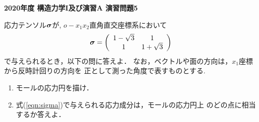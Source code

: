 \documentclass[10pt,a4j]{jarticle}
\newlength{\minitwocolumn}
\begin{document}
\newcommand{\fat}[1]{\mbox{\boldmath $#1$}}
\newcommand{\D}{\partial}
\newcommand{\w}{\omega}
\newcommand{\ga}{\alpha}
\newcommand{\gb}{\beta}
\newcommand{\gx}{\xi}
\newcommand{\gz}{\zeta}
\newcommand{\vhat}[1]{\hat{\fat{#1}}}
\newcommand{\spc}{\vspace{0.7\baselineskip}}
\newcommand{\halfspc}{\vspace{0.3\baselineskip}}

\pagestyle{empty}
\newcommand{\twofig}[2]
 {
   \begin{figure}[here]
     \begin{minipage}[t]{\minitwocolumn}
         \begin{center}   #1
         \end{center}
     \end{minipage}
         \hspace{\columnsep}
     \begin{minipage}[t]{\minitwocolumn}
         \begin{center} #2
         \end{center}
     \end{minipage}
   \end{figure}
 }
\begin{center}
{\Large \bf 2020年度 構造力学I及び演習A 演習問題5}
\end{center}
\vspace{15mm}
応力テンソル$\fat{\sigma}$が, $o-x_1x_2$直角直交座標系において
\begin{equation}
	\fat{\sigma}
	=
	\left( 
		\begin{array}{cc}
			1-\sqrt{3} & 1\\
			1 & 1+\sqrt{3}
		\end{array}
	\right)
	\label{eqn:sigma}
\end{equation}
で与えられるとき，以下の問に答えよ．
なお，ベクトルや面の方向は，$x_1$座標から反時計回りの方向を
正として測った角度で表すものとする.
\begin{enumerate}
\item
	モールの応力円を描け．
\item
	式(\ref{eqn:sigma})で与えられる応力成分は，モールの応力円上
	のどの点に相当するか答えよ．
\end{enumerate}
\end{document}
